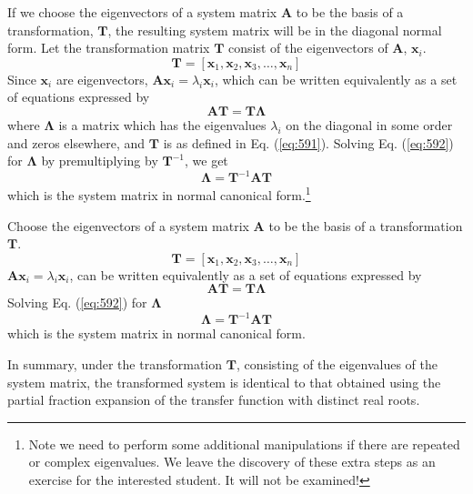 If we choose the eigenvectors of a system matrix $\mathbf{A}$ to be the basis of a transformation, $\mathbf{T}$, the resulting system matrix will be in the diagonal normal form. Let the transformation matrix $\mathbf{T}$ consist of the eigenvectors of $\mathbf{A}$, $\mathbf{x}_i$.
\begin{equation}\label{eq:591}
	\mathbf{T}=[\mathbf{x}_1, \mathbf{x}_2, \mathbf{x}_3, \ldots, \mathbf{x}_n] 
\end{equation}
Since $\mathbf{x}_i$ are eigenvectors, $\mathbf{A}\mathbf{x}_i=\lambda_i\mathbf{x}_i$, which can be written equivalently as a set of equations expressed by
\begin{equation}\label{eq:592}
	\mathbf{AT}=\mathbf{T\Lambda}
\end{equation}
where $\mathbf{\Lambda}$ is a matrix which has the eigenvalues $\lambda_i$ on the diagonal in some order and zeros elsewhere, and $\mathbf{T}$ is as defined in Eq. (\ref{eq:591}). Solving Eq. (\ref{eq:592}) for $\mathbf{\Lambda}$ by premultiplying by $\mathbf{T}^{-1}$, we get
\begin{equation}\label{eq:593}
	\mathbf{\Lambda}=\mathbf{T}^{-1}\mathbf{AT} 
\end{equation}
which is the system matrix in normal canonical form.\footnote{Note we need to perform some additional manipulations if there are repeated or complex eigenvalues. We leave the discovery of these extra steps as an exercise for the interested student. It will not be examined!}
\ifslidesonly
\begin{slide}
   Choose the eigenvectors of a system matrix $\mathbf{A}$ to be the basis of a transformation $\mathbf{T}$.
\begin{equation}\label{eq:591}
	\mathbf{T}=[\mathbf{x}_1, \mathbf{x}_2, \mathbf{x}_3, \ldots, \mathbf{x}_n] 
\end{equation}
$\mathbf{A}\mathbf{x}_i=\lambda_i\mathbf{x}_i$, can be written equivalently as a set of equations expressed by
\begin{equation}\label{eq:592}
	\mathbf{AT}=\mathbf{T\Lambda}
\end{equation}
Solving Eq. (\ref{eq:592}) for $\mathbf{\Lambda}$
\begin{equation}\label{eq:593}
	\mathbf{\Lambda}=\mathbf{T}^{-1}\mathbf{AT} 
\end{equation}
which is the system matrix in normal canonical form.
\end{slide}
\fi
In summary, under the transformation $\mathbf{T}$, consisting of the eigenvalues of the system matrix, the transformed system is identical to that obtained using the partial fraction expansion of the transfer function with distinct real roots. 

